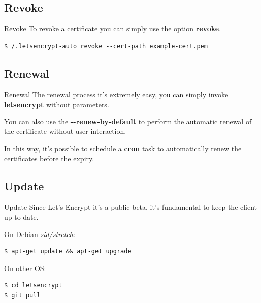 \documentclass[xcolor=svgnames,11pt]{beamer}
\begin{document}
\subsection{Revoke}
\begin{frame}[fragile]{Revoke}
To revoke a certificate you can simply use the option \textbf{revoke}.

\medskip\pause

\begin{block}{}
\begin{scriptsize}
\begin{verbatim}
$ /.letsencrypt-auto revoke --cert-path example-cert.pem
\end{verbatim}
\end{scriptsize}
\end{block}
\end{frame}

\subsection{Renewal}
\begin{frame}[fragile]{Renewal}
The renewal process it's extremely easy, you can simply invoke \textbf{letsencrypt} without parameters.

\medskip\pause

You can also use the \textbf{-{}-renew-by-default} to perform the automatic renewal of the certificate without user interaction.

\medskip\pause

In this way, it's possible to schedule a \textbf{cron} task to automatically renew the certificates before the expiry.

\end{frame}

\subsection{Update}
\begin{frame}[fragile]{Update}
Since Let's Encrypt it's a public beta, it's fundamental to keep the client up to date.

\medskip\pause
On Debian \emph{sid/stretch}:
\begin{block}{}
\begin{scriptsize}
\begin{verbatim}
$ apt-get update && apt-get upgrade
\end{verbatim}
\end{scriptsize}
\end{block}

\medskip\pause
On other OS:
\begin{block}{}
\begin{scriptsize}
\begin{verbatim}
$ cd letsencrypt
$ git pull
\end{verbatim}
\end{scriptsize}
\end{block}

\end{frame}
\end{document}
